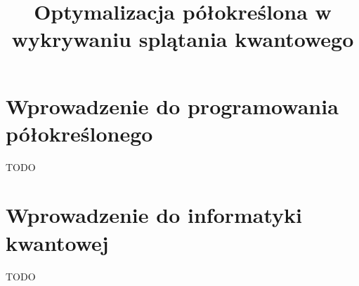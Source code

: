 \documentclass[a4paper,12pt]{article}
\title{Optymalizacja półokreślona w wykrywaniu splątania kwantowego}
\date{}
\begin{document}
\maketitle
\tableofcontents

\section{Wprowadzenie do programowania półokreślonego}

TODO

\section{Wprowadzenie do informatyki kwantowej}

TODO
\end{document}
